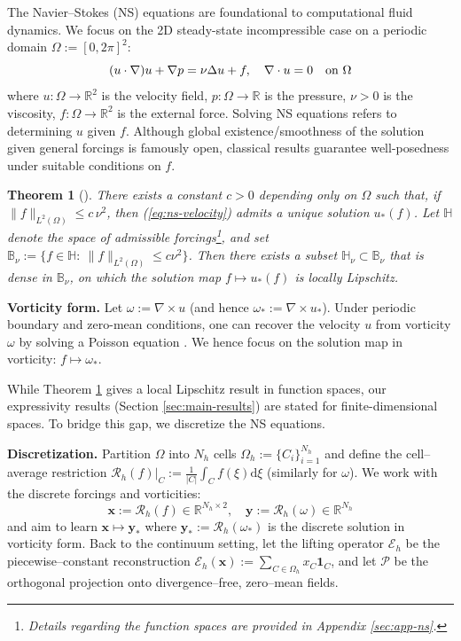 \documentclass{amsart} %
\def\eqref#1{equation~\ref{#1}}
\def\vone{{\bm{1}}}
\def\vx{{\bm{x}}}
\def\vy{{\bm{y}}}
\def\sB{{\mathbb{B}}}
\def\sH{{\mathbb{H}}}
\def\sR{{\mathbb{R}}}
\def\cE{{\mathcal{E}}}
\def\cP{{\mathcal{P}}}
\def\cR{{\mathcal{R}}}
\newtheorem{theorem}{Theorem}[section]
\theoremstyle{definition}
\theoremstyle{remark}
\renewcommand{\eqref}[1]{\textup{(\ref{#1})}}
\begin{document}
The Navier--Stokes (NS) equations are foundational to computational fluid dynamics. We focus on the 2D steady-state incompressible case on a periodic domain $\Omega:=[0,2\pi]^2$:
\begin{equation}
\label{eq:ns-velocity}
(u \cdot \nabla) u + \nabla p = \nu \Delta u + f, \quad \nabla \cdot u = 0 \quad \textup{on $\Omega$}
\end{equation}
where $u:\Omega \to \sR^2$ is the velocity field, $p:\Omega \to \sR$ is the pressure, $\nu > 0$ is the viscosity, $f:\Omega \to \sR^2$ is the external force. Solving NS equations refers to determining $u$ given $f$. 
Although global existence/smoothness of the solution given general forcings is famously open, classical results guarantee well-posedness under suitable conditions on $f$. 

\begin{theorem}[\cite{temam1995navier}]
\label{thm:ns-existence}
There exists a constant $c>0$ depending only on $\Omega$ such that, if $\|f\|_{L^2(\Omega)} \le c\,\nu^2$, then \eqref{eq:ns-velocity} admits a unique solution $u_\ast(f)$.
Let $\sH$ denote the space of admissible forcings\footnote{Details regarding the function spaces are provided in Appendix \ref{sec:app-ns}.}, and set $\sB_\nu:=\{f\in\sH:\ \|f\|_{L^2(\Omega)}\le c \nu^2\}$.
Then there exists a subset $\sH_\nu\subset\sB_\nu$ that is dense in $\sB_\nu$, on which the solution map $f\mapsto u_\ast(f)$ is locally Lipschitz.
\end{theorem}


\textbf{Vorticity form.} Let $\omega := \nabla \times u$ (and hence $\omega_\ast := \nabla \times u_\ast$). Under periodic boundary and zero-mean conditions, one can recover the velocity $u$ from vorticity $\omega$ by solving a Poisson equation \cite{majda2001vorticity}. We hence focus on the solution map in vorticity: $f \mapsto \omega_\ast$.

While Theorem \ref{thm:ns-existence} gives a local Lipschitz result in function spaces, our expressivity results (Section \ref{sec:main-results}) are stated for finite-dimensional spaces. To bridge this gap, we discretize the NS equations.



\textbf{Discretization.}
Partition $\Omega$ into $N_h$ cells $\Omega_h := \{C_i\}_{i=1}^{N_h}$ and define the cell–average restriction $\cR_h (f)|_{C} := \frac{1}{|C|}\int_{C} f(\xi) \mathrm{d}\xi$ (similarly for $\omega$). We work with the discrete forcings and vorticities:
\[\vx := \cR_h (f) \in \sR^{N_h \times 2}, \quad \vy:=\cR_h (\omega) \in \sR^{N_h}
\]
and aim to learn $\vx \mapsto \vy_\ast$ where $\vy_\ast := \cR_h(\omega_\ast)$ is the discrete solution in vorticity form. Back to the continuum setting, let the lifting operator $\cE_h$ be the piecewise–constant reconstruction $\cE_h(\vx):= \sum_{C \in \Omega_h} x_C \vone_{C}$, and let $\cP$ be the orthogonal projection onto divergence–free, zero–mean fields.
\end{document}
